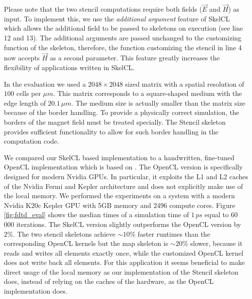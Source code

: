Please note that the two stencil computations require both fields ($\vec{E}$ and $\vec{H}$) as input.
To implement this, we use the \emph{additional argument} feature of SkelCL which allows the additional field to be passed to skeletons on execution (see line 12 and 13).
The additional arguments are passed unchanged to the customizing function of the skeleton, therefore, the function customizing the stencil in line 4 now accepts $\vec{H}$ as a second parameter.
This feature greatly increases the flexibility of applications written in SkelCL.

In the evaluation we used a $2048 \times 2048$ sized matrix with a spatial resolution of $100$ cells per $\mu m$. 
This matrix corresponds to a square-shaped medium with the edge length of $20.1\,\mu m$. 
The medium size is actually smaller than the matrix size because of the border handling. 
To provide a physically correct simulation, the borders of the magnet field must be treated specially.
The Stencil skeleton provides sufficient functionality to allow for such border handling in the computation code.


We compared our SkelCL based implementation to a handwritten, fine-tuned OpenCL implementation which is based on \cite{Knitter2013}.
The OpenCL version is specifically designed for modern Nvidia GPUs.
In particular, it exploits the L1 and L2 caches of the Nvidia Fermi and Kepler architecture and does not explicitly make use of the local memory.
We performed the experiments on a system with a modern Nvidia K20c Kepler GPU with 5GB memory and 2496 compute cores.
Figure \ref{fig:fdtd_eval} shows the median times of a simulation time of $1\,ps$ equal to 60\, 000 iterations.
The SkelCL version slightly outperforms the OpenCL version by $2\%$.
The two stencil skeletons achieve ${\sim}10\%$ faster runtimes than the corresponding OpenCL kernels but the map skeleton is ${\sim}20\%$ slower, because it reads and writes all elements exactly once, while the customized OpenCL kernel does not write back all elements.
For this application it seems beneficial to make direct usage of the local memory as our implementation of the Stencil skeleton does, instead of relying on the caches of the hardware, as the OpenCL implementation does.

